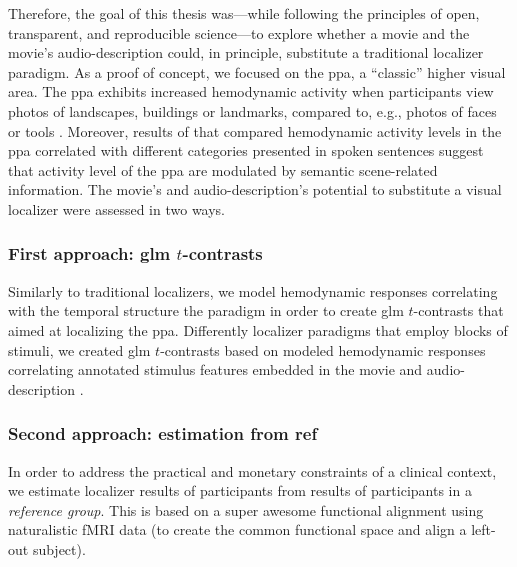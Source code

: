 Therefore, the goal of this thesis was---while following the principles of open,
transparent, and reproducible science---to explore whether a movie and the
movie's audio-description could, in principle, substitute a traditional
localizer paradigm.
As a proof of concept, we focused on the \ac{ppa}, a ``classic'' higher visual
area.
%
The \ac{ppa} exhibits increased hemodynamic activity when participants view
photos of landscapes, buildings or landmarks, compared to, e.g., photos of faces
or tools \citep[e.g.,][for reviews]{epstein2014neural, aminoff2013role}.
%
Moreover, results of \citep{aziz2008modulation} that compared hemodynamic
activity levels in the \ac{ppa} correlated with different categories
presented in spoken sentences suggest that activity level of the  \ac{ppa}
are modulated by semantic scene-related information.
%
The movie's and audio-description's potential to substitute a
visual localizer were assessed in two ways.


\subsubsection{First approach: \ac{glm} $t$-contrasts}


Similarly to traditional localizers, we model hemodynamic responses correlating
with the temporal structure the paradigm in order to create \ac{glm}
$t$-contrasts that aimed at localizing the \ac{ppa}.
%
Differently localizer paradigms that employ blocks of stimuli, we created
\ac{glm} $t$-contrasts based on modeled hemodynamic responses correlating
annotated stimulus features embedded in the movie \citep{haeusler2016cutanno}
and audio-description \citep{haeusler2021speechanno}.


\subsubsection{Second approach: estimation from ref}


%
In order to address the practical and monetary constraints of a clinical
context, we estimate localizer results of participants from results of
participants in a \textit{reference group}.
%
This is based on a super awesome functional alignment using naturalistic fMRI
data (to create the common functional space and align a left-out subject).



